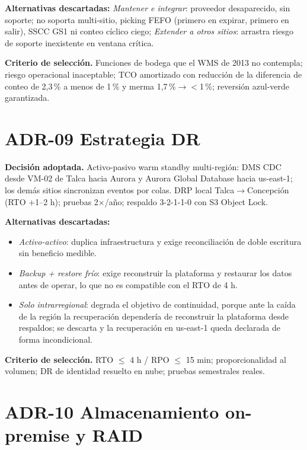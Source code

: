 \textbf{Alternativas descartadas:} \emph{Mantener e integrar}: proveedor desaparecido, sin soporte; no soporta multi-sitio, picking FEFO (primero en expirar, primero en salir), SSCC GS1 ni conteo cíclico ciego; \emph{Extender a otros sitios}: arrastra riesgo de soporte inexistente en ventana crítica.

\textbf{Criterio de selección.} Funciones de bodega que el WMS de 2013 no contempla; riesgo operacional inaceptable; TCO amortizado con reducción de la diferencia de conteo de 2,3\,\% a menos de 1\,\% y merma 1,7\,\%$\rightarrow$$<$1\,\%; reversión azul-verde garantizada.

\section{ADR-09 \textperiodcentered{} Estrategia DR}
\label{sub:adr-09}

\textbf{Decisión adoptada.} Activo-pasivo warm standby multi-región: DMS CDC desde VM-02 de Talca hacia Aurora y Aurora Global Database hacia us-east-1; los demás sitios sincronizan eventos por colas. DRP local Talca$\rightarrow$Concepción (RTO +1--2 h); pruebas 2$\times$/año; respaldo 3-2-1-1-0 con S3 Object Lock.

\textbf{Alternativas descartadas:}

\begin{itemize}
  \item \emph{Activo-activo}: duplica infraestructura y exige reconciliación de doble escritura sin beneficio medible.
  \item \emph{Backup + restore frío}: exige reconstruir la plataforma y restaurar los datos antes de operar, lo que no es compatible con el RTO de 4 h.
  \item \emph{Solo intrarregional}: degrada el objetivo de continuidad, porque ante la caída de la región la recuperación dependería de reconstruir la plataforma desde respaldos; se descarta y la recuperación en us-east-1 queda declarada de forma incondicional.
\end{itemize}

\textbf{Criterio de selección.} RTO $\leq$ 4 h / RPO $\leq$ 15 min; proporcionalidad al volumen; DR de identidad resuelto en nube; pruebas semestrales reales.

\section{ADR-10 \textperiodcentered{} Almacenamiento on-premise y RAID}
\label{sub:adr-10}


